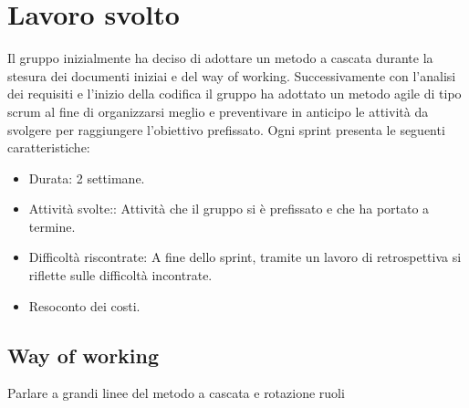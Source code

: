 \section{Lavoro svolto}
Il gruppo inizialmente ha deciso di adottare un metodo a cascata durante la stesura dei documenti iniziai e del way of working. Successivamente con l'analisi dei requisiti e l'inizio della codifica il gruppo ha adottato un metodo agile di tipo scrum al fine di organizzarsi meglio e preventivare in anticipo le attività da svolgere per raggiungere l'obiettivo prefissato.
Ogni sprint presenta le seguenti caratteristiche:
\begin{itemize}
    \item{Durata:} 2 settimane.
    \item{Attività svolte::} Attività che il gruppo si è prefissato e che ha portato a termine.
    \item{Difficoltà riscontrate:} A fine dello sprint, tramite un lavoro di retrospettiva si riflette sulle difficoltà incontrate.
    \item{Resoconto dei costi.}
\end{itemize}

\subsection{Way of working}
Parlare a grandi linee del metodo a cascata e rotazione ruoli


